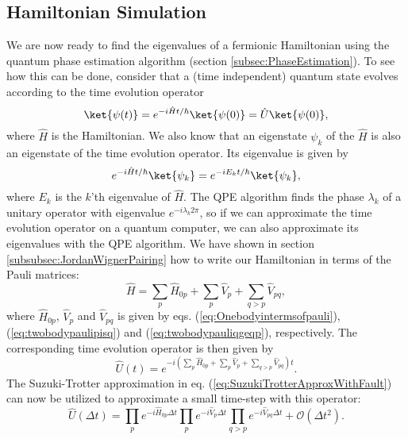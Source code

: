 \subsection{Hamiltonian Simulation}
\label{subsec:HamiltonianSimulation}
We are now ready to find the eigenvalues of a fermionic Hamiltonian using the quantum phase estimation algorithm (section \ref{subsec:PhaseEstimation}). To see how this can be done, consider that a (time independent) quantum state evolves according to the time evolution operator
\begin{equation}
    \label{eq:TimeEvolution}
    \ket{\psi (t)} = e^{-i\hat{H} t/\hbar}\ket{\psi (0)} = \hat{U} \ket{\psi (0)},
\end{equation}
where $\hat{H}$ is the Hamiltonian.
We also know that an eigenstate $\psi_k$ of the $\hat{H}$ is also an eigenstate of the time evolution operator. Its eigenvalue is given by
\begin{equation}
    \label{eq:TimeEvoEigenval}
    e^{-i\hat{H} t/\hbar}\ket{\psi_k} = e^{-i E_k t / \hbar }\ket{\psi_k},
\end{equation}
where $E_k$ is the $k$'th eigenvalue of $\hat{H}$.
The QPE algorithm finds the phase $\lambda_k$ of a unitary operator with eigenvalue $e^{-i\lambda_k 2\pi}$, so if we can approximate the time evolution operator on a quantum computer, we can also approximate its eigenvalues with the QPE algorithm. 
We have shown in section \ref{subsubsec:JordanWignerPairing} how to write our Hamiltonian in terms of the Pauli matrices:
\begin{equation}
    \label{eq:FullPauliHamiltonian}
    \hat{H} = \sum_p \hat{H}_{0p} + \sum_{p} \hat{V}_p + \sum_{q > p} \hat{V}_{pq},
\end{equation}
where $\hat{H}_{0p}$, $\hat{V}_p$ and $\hat{V}_{pq}$ is given by eqs. (\ref{eq:Onebodyintermsofpauli}), (\ref{eq:twobodypaulipisq}) and (\ref{eq:twobodypauliqgeqp}), respectively.
The corresponding time evolution operator is then given by
\begin{equation}
    \label{eq:TimeEvoPauli}
    \hat{U}(t) = e^{-i(\sum_p \hat{H}_{0p} + \sum_{p} \hat{V}_p + \sum_{q > p} \hat{V}_{pq})t}.
\end{equation}
The Suzuki-Trotter approximation in eq. (\ref{eq:SuzukiTrotterApproxWithFault}) can now be utilized to approximate a small time-step with this operator:
\begin{equation}
    \label{eq:TimeEvoTrotterApprox}
    \hat{U}(\Delta t) = \prod_p e^{-i\hat{H}_{0p}\Delta t}\prod_p e^{-i\hat{V}_p \Delta t} \prod_{q>p} e^{-i\hat{V}_{pq} \Delta t} + \mathcal{O}(\Delta t^2).
\end{equation}
